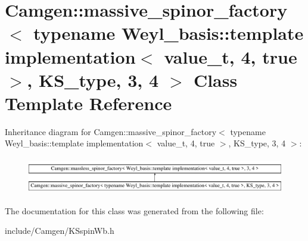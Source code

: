 \hypertarget{a00349}{\section{Camgen\-:\-:massive\-\_\-spinor\-\_\-factory$<$ typename Weyl\-\_\-basis\-:\-:template implementation$<$ value\-\_\-t, 4, true $>$, K\-S\-\_\-type, 3, 4 $>$ Class Template Reference}
\label{a00349}
}
Inheritance diagram for Camgen\-:\-:massive\-\_\-spinor\-\_\-factory$<$ typename Weyl\-\_\-basis\-:\-:template implementation$<$ value\-\_\-t, 4, true $>$, K\-S\-\_\-type, 3, 4 $>$\-:\begin{figure}[H]
\begin{center}
\leavevmode
\includegraphics[height=1.618497cm]{a00349}
\end{center}
\end{figure}


The documentation for this class was generated from the following file\-:\begin{DoxyCompactItemize}
\item 
include/\-Camgen/K\-Sspin\-Wb.\-h\end{DoxyCompactItemize}
